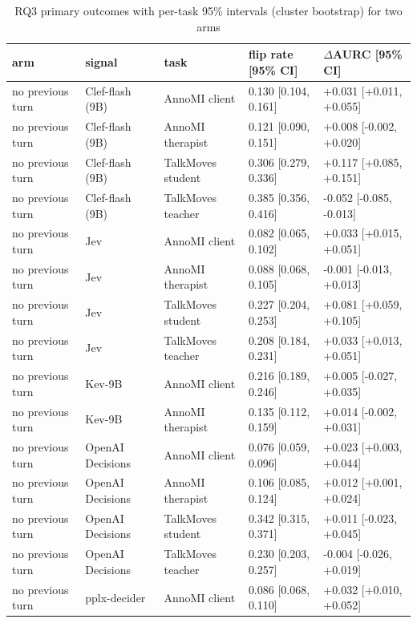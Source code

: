 \begin{table}[t]
\centering
\small
\caption{RQ3 primary outcomes with per-task 95\% intervals (cluster bootstrap) for two arms}
\label{tab:tab06b_rq3_intervals}
\begin{adjustbox}{max width=\linewidth}
\begin{tabular}{lllll}
\toprule
arm & signal & task & \makecell[bl]{flip rate \\{} [95\% CI]} & \makecell[bl]{$\Delta$AURC [95\% \\{} CI]} \\
\midrule
no previous turn & Clef-flash (9B) & AnnoMI client & 0.130 [0.104, 0.161] & +0.031 [+0.011, +0.055] \\
no previous turn & Clef-flash (9B) & AnnoMI therapist & 0.121 [0.090, 0.151] & +0.008 [-0.002, +0.020] \\
no previous turn & Clef-flash (9B) & TalkMoves student & 0.306 [0.279, 0.336] & +0.117 [+0.085, +0.151] \\
no previous turn & Clef-flash (9B) & TalkMoves teacher & 0.385 [0.356, 0.416] & -0.052 [-0.085, -0.013] \\
no previous turn & Jev & AnnoMI client & 0.082 [0.065, 0.102] & +0.033 [+0.015, +0.051] \\
no previous turn & Jev & AnnoMI therapist & 0.088 [0.068, 0.105] & -0.001 [-0.013, +0.013] \\
no previous turn & Jev & TalkMoves student & 0.227 [0.204, 0.253] & +0.081 [+0.059, +0.105] \\
no previous turn & Jev & TalkMoves teacher & 0.208 [0.184, 0.231] & +0.033 [+0.013, +0.051] \\
no previous turn & Kev-9B & AnnoMI client & 0.216 [0.189, 0.246] & +0.005 [-0.027, +0.035] \\
no previous turn & Kev-9B & AnnoMI therapist & 0.135 [0.112, 0.159] & +0.014 [-0.002, +0.031] \\
no previous turn & OpenAI Decisions & AnnoMI client & 0.076 [0.059, 0.096] & +0.023 [+0.003, +0.044] \\
no previous turn & OpenAI Decisions & AnnoMI therapist & 0.106 [0.085, 0.124] & +0.012 [+0.001, +0.024] \\
no previous turn & OpenAI Decisions & TalkMoves student & 0.342 [0.315, 0.371] & +0.011 [-0.023, +0.045] \\
no previous turn & OpenAI Decisions & TalkMoves teacher & 0.230 [0.203, 0.257] & -0.004 [-0.026, +0.019] \\
no previous turn & pplx-decider & AnnoMI client & 0.086 [0.068, 0.110] & +0.032 [+0.010, +0.052] \\

\end{tabular}
\end{adjustbox}
\end{table}
